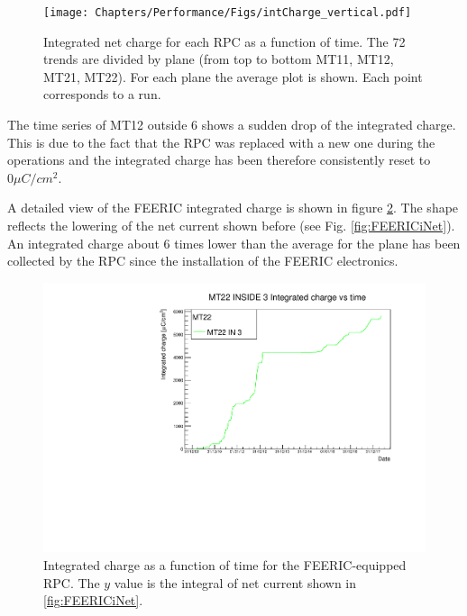 \begin{figure}[!t]
\begin{center}
\texttt{[image: Chapters/Performance/Figs/intCharge\_vertical.pdf]}
\caption{Integrated net charge for each RPC as a function of time. The 72 trends are divided by plane (from top to bottom MT11, MT12, MT21, MT22). For each plane the average plot is shown. Each point corresponds to a run.}
\label{fig:ICharge4Planes}
\end{center}
\end{figure}


The time series of MT12 outside 6 shows a sudden drop of the integrated charge. 
This is due to the fact that the RPC was replaced with a new one during the operations and the integrated charge has been therefore consistently reset to $0\mu C/cm^2$.

A detailed view of the FEERIC integrated charge is shown in figure \ref{fig:FEERICIntCharge}.
The shape reflects the lowering of the net current shown before (see Fig. \ref{fig:FEERICiNet}).
An integrated charge about $6$ times lower than the average for the plane has been collected by the RPC since the installation of the FEERIC electronics.

\begin{figure}[!t]
\begin{center}
\includegraphics[width=0.95\linewidth]{Chapters/Performance/Figs/IntChargeFEERIC.pdf}
\caption{Integrated charge as a function of time for the FEERIC-equipped RPC. The $y$ value is the integral of net current shown in \ref{fig:FEERICiNet}.}
\label{fig:FEERICIntCharge}
\end{center}
\end{figure}

